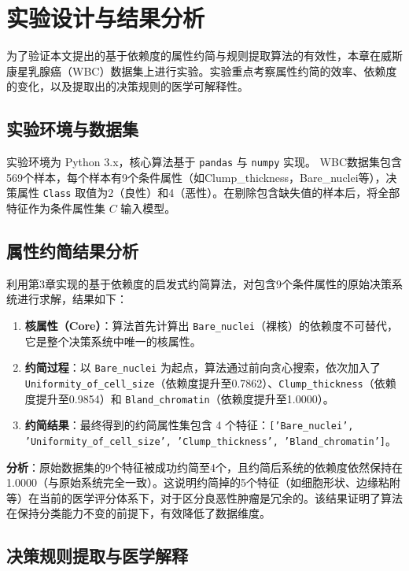 
\chapter{实验设计与结果分析}

为了验证本文提出的基于依赖度的属性约简与规则提取算法的有效性，本章在威斯康星乳腺癌（WBC）数据集上进行实验。实验重点考察属性约简的效率、依赖度的变化，以及提取出的决策规则的医学可解释性。

\section{实验环境与数据集}

实验环境为 Python 3.x，核心算法基于 \texttt{pandas} 与 \texttt{numpy} 实现。
WBC数据集包含569个样本，每个样本有9个条件属性（如Clump\_thickness，Bare\_nuclei等），决策属性 \texttt{Class} 取值为2（良性）和4（恶性）。在剔除包含缺失值的样本后，将全部特征作为条件属性集 \(C\) 输入模型。

\section{属性约简结果分析}

利用第3章实现的基于依赖度的启发式约简算法，对包含9个条件属性的原始决策系统进行求解，结果如下：

\begin{enumerate}
	\item \textbf{核属性（Core）}：算法首先计算出 \texttt{Bare\_nuclei}（裸核）的依赖度不可替代，它是整个决策系统中唯一的核属性。
	\item \textbf{约简过程}：以 \texttt{Bare\_nuclei} 为起点，算法通过前向贪心搜索，依次加入了 \texttt{Uniformity\_of\_cell\_size}（依赖度提升至0.7862）、\texttt{Clump\_thickness}（依赖度提升至0.9854）和 \texttt{Bland\_chromatin}（依赖度提升至1.0000）。
	\item \textbf{约简结果}：最终得到的约简属性集包含 4 个特征：\texttt{['Bare\_nuclei', 'Uniformity\_of\_cell\_size', 'Clump\_thickness', 'Bland\_chromatin']}。
\end{enumerate}

\textbf{分析}：原始数据集的9个特征被成功约简至4个，且约简后系统的依赖度依然保持在 1.0000（与原始系统完全一致）。这说明约简掉的5个特征（如细胞形状、边缘粘附等）在当前的医学评分体系下，对于区分良恶性肿瘤是冗余的。该结果证明了算法在保持分类能力不变的前提下，有效降低了数据维度。

\section{决策规则提取与医学解释}

